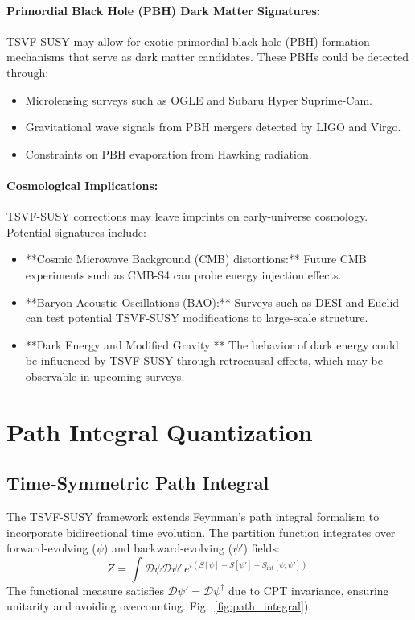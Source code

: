 \documentclass[twocolumn,superscriptaddress,floatfix]{revtex4-2}
\begin{document}
\paragraph{Primordial Black Hole (PBH) Dark Matter Signatures:}  
TSVF-SUSY may allow for exotic primordial black hole (PBH) formation mechanisms that serve as dark matter candidates. These PBHs could be detected through:
\begin{itemize}
    \item Microlensing surveys such as OGLE and Subaru Hyper Suprime-Cam.
    \item Gravitational wave signals from PBH mergers detected by LIGO and Virgo.
    \item Constraints on PBH evaporation from Hawking radiation.

\end{itemize}

\paragraph{Cosmological Implications:}  
TSVF-SUSY corrections may leave imprints on early-universe cosmology. Potential signatures include:
\begin{itemize}
    \item **Cosmic Microwave Background (CMB) distortions:** Future CMB experiments such as CMB-S4 can probe energy injection effects.
    \item **Baryon Acoustic Oscillations (BAO):** Surveys such as DESI and Euclid can test potential TSVF-SUSY modifications to large-scale structure.
    \item **Dark Energy and Modified Gravity:** The behavior of dark energy could be influenced by TSVF-SUSY through retrocausal effects, which may be observable in upcoming surveys.
\end{itemize}


\section{Path Integral Quantization}  
\label{sec:path_integral}  

\subsection{Time-Symmetric Path Integral}
The TSVF-SUSY framework extends Feynman's path integral formalism to incorporate bidirectional time evolution. The partition function integrates over forward-evolving ($\psi$) and backward-evolving ($\psi'$) fields:
\begin{equation}
Z = \int \mathcal{D}\psi \mathcal{D}\psi' \, e^{i(S[\psi] - S[\psi'] + S_{\text{int}}[\psi, \psi'])}.
\end{equation}
The functional measure satisfies $\mathcal{D}\psi' = \mathcal{D}\psi^{\dagger}$ due to CPT invariance, ensuring unitarity and avoiding overcounting. Fig.~\ref{fig:path_integral}).  
\end{document}
